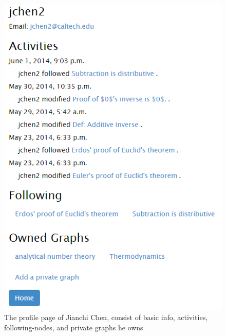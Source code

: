 \documentclass{acm_proc_article-sp}
\begin{document}
\begin{itemize}
\begin{figure}[h!]
\includegraphics[scale=0.52]{profile.png}
\caption{The profile page of Jianchi Chen, consist of basic info, activities, following-nodes, and private graphs he owns}
\end{figure}\\


\end{itemize}
\end{document}
